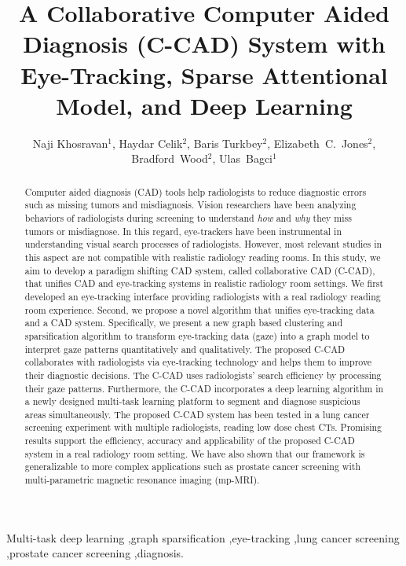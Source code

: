 \documentclass[preprint,12pt]{elsarticle}
\begin{document}
\begin{frontmatter}

\title{A Collaborative Computer Aided Diagnosis (C-CAD) System with Eye-Tracking, Sparse Attentional Model, and Deep Learning}

\author{Naji Khosravan$^1$, Haydar Celik$^2$, Baris Turkbey$^2$, Elizabeth~C.~Jones$^2$, Bradford~Wood$^2$, Ulas~Bagci$^1$}
 \address{$^1$Center for Research in Computer Vision, University of Central Florida, FL.\\
 $^2$Clinical Center, National Institutes of Health, Bethesda, MD.}




\begin{abstract}
Computer aided diagnosis (CAD) tools help radiologists to reduce diagnostic errors such as missing tumors and misdiagnosis. Vision researchers have been analyzing behaviors of radiologists during screening to understand \textit{how} and \textit{why} they miss tumors or misdiagnose. In this regard, eye-trackers have been instrumental in understanding visual search processes of radiologists. However, most relevant studies in this aspect are not compatible with realistic radiology reading rooms. In this study, we aim to develop a paradigm shifting CAD system, called collaborative CAD (C-CAD), that unifies CAD and eye-tracking systems in realistic radiology room settings. We first developed an eye-tracking interface providing radiologists with a real radiology reading room experience. Second, we propose a novel algorithm that unifies eye-tracking data and a CAD system. Specifically, we present a new graph based clustering and sparsification algorithm to transform eye-tracking data (gaze) into a graph model to interpret gaze patterns quantitatively and qualitatively. The proposed C-CAD collaborates with radiologists via eye-tracking technology and helps them to improve their diagnostic decisions. The C-CAD uses radiologists' search efficiency by processing their gaze patterns. Furthermore, the C-CAD incorporates a deep learning algorithm in a newly designed multi-task learning platform to segment and diagnose suspicious areas simultaneously. The proposed C-CAD system has been tested in a lung cancer screening experiment with multiple radiologists, reading low dose chest CTs. Promising results support the efficiency, accuracy and applicability of the proposed C-CAD system in a real radiology room setting.  We have also shown that our framework is generalizable to more complex applications such as prostate cancer screening with multi-parametric magnetic resonance imaging (mp-MRI).
\end{abstract}

\begin{keyword}
Multi-task deep learning \sep graph sparsification \sep eye-tracking \sep  lung cancer screening \sep prostate cancer screening  \sep diagnosis.
\end{keyword}

\end{frontmatter}
\end{document}
